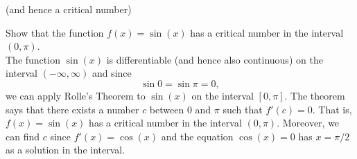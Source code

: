 \documentclass{ximera}
\begin{document}
(and hence a critical number)

\begin{example} Show that the function $f(x) = \sin(x)$ has a critical number in the interval $(0, \pi)$.\\
The function $\sin(x)$ is differentiable (and hence also continuous) on the interval $(-\infty, \infty)$ and since
\[
\sin 0 = \sin \pi = 0,
\]
we can apply Rolle's Theorem to $\sin(x)$ on the interval $[0, \pi]$. The theorem says that there exists a number $c$ between $0$ and $\pi$ such that 
$f'(c) = 0$. That is, $f(x) = \sin(x)$ has a critical number in the interval $(0, \pi)$.
Moreover, we can find $c$ since $f'(x) = \cos(x)$ and the equation $\cos(x) = 0$ has $x = \pi/2$ as a solution in the interval.
\end{example}
\end{document}
